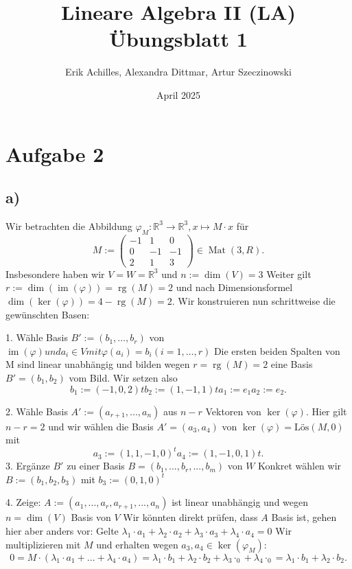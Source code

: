 \documentclass{article}
\title{Lineare Algebra II (LA) Übungsblatt 1}
\author{Erik Achilles, Alexandra Dittmar, Artur Szeczinowski}
\date{April 2025}
\newcommand{\RR}{\mathbb{R}}
\DeclareMathOperator{\Mat}{Mat}
\DeclareMathOperator{\im}{im}
\DeclareMathOperator{\rg}{rg}
\DeclareMathOperator{\Kern}{ker}
\newcommand{\legs}[2]{\left(\begin{array}{#1}#2\end{array}\right)}
\begin{document}
\maketitle
\section*{Aufgabe 2}

\subsection*{a)}

Wir betrachten die Abbildung
$\varphi_M : \RR^3 \to \RR^3, x \mapsto M \cdot x$
für
\[
    M :=
    \legs{ccc}{
        -1 & 1 & 0  \\
        0 & -1 & -1 \\
        2 & 1 & 3
    }
    \in \Mat(3,R).
\]
Insbesondere haben wir
$V = W = \RR^3$
und
$n := \dim(V) = 3$
Weiter gilt
$r := \dim(\im(\varphi)) = \rg(M) = 2$
und nach Dimensionsformel
$\dim(\Kern(\varphi)) = 4 - \rg(M) = 2$.
Wir konstruieren nun schrittweise die gewünschten Basen:

1. Wähle Basis
$B' := (b_1,\ldots,b_r )$
von
$\im(\varphi) und a_i \in V mit \varphi(a_i) = b_i (i=1,\ldots,r)$
Die ersten beiden Spalten von M sind linear unabhängig und bilden wegen
$r = \rg(M) = 2$ eine Basis
$B' = (b_1,b_2)$
vom Bild. Wir setzen also
\[
    b_1 := (-1,0,2)t
    b_2 := (1,-1,1)t
    a_1 := e_1
    a_2 := e_2.
\]

2. Wähle Basis
$A' := (a_{r +1},...,a_n)$
aus $n -r$ Vektoren von
$\Kern(\varphi)$.
Hier gilt
$n -r = 2$
und wir wählen die Basis
$A' = (a_3,a_4)$ von
$\Kern(\varphi) = \text{Lös}(M,0)$
mit
\[a_3 := (1,1,-1,0)^t
    a_4 := (1,-1,0,1)t
    .\]
3. Ergänze $B'$
zu einer Basis
$B = (b_1,...,b_r
    ,...,b_m)$ von $W$
Konkret wählen wir
$B := (b_1,b_2,b_3)$
mit
$b_3 := (0,1,0)^t$

4. Zeige:
$A := (a_1,...,a_r
    ,a_{r +1},...,a_n)$
ist linear unabhängig und wegen
$n = \dim(V )$
Basis von
$V$
Wir könnten direkt prüfen, dass $A$ Basis ist, gehen hier aber anders vor: Gelte
$\lambda_1 \cdot a_1 +\lambda_2 \cdot a_2 +\lambda_3 \cdot a_3 +\lambda_4 \cdot a_4 = 0$
Wir multiplizieren mit $M$ und erhalten wegen
$a_3,a_4 \in \Kern(\varphi_M )$:
\[
    0 = M \cdot(\lambda_1 \cdot a_1 +...+\lambda_4 \cdot a_4) = \lambda_1 \cdot b_1 +\lambda_2 \cdot b_2 +\lambda_3 \cdot_0+\lambda_4 \cdot_0 = \lambda_1 \cdot b_1 +\lambda_2 \cdot b_2.
\]
\end{document}
